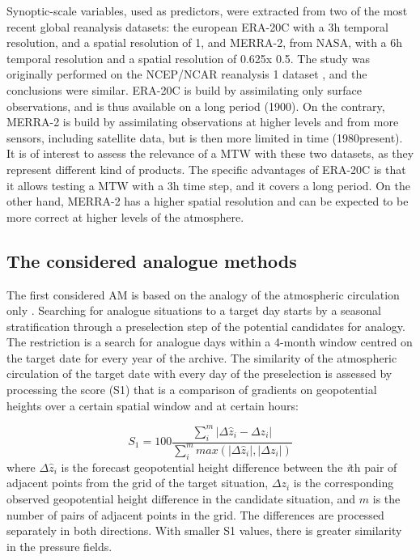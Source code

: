 \documentclass[hess, manuscript]{copernicus}
\begin{document}
	Synoptic-scale variables, used as predictors, were extracted from two of the most recent global reanalysis datasets: the european ERA-20C \citep{Poli2016} with a 3h temporal resolution, and a spatial resolution of 1\textdegree, and MERRA-2, from NASA, with a 6h temporal resolution and a spatial resolution of 0.625\textdegree x 0.5\textdegree. The study was originally performed on the NCEP/NCAR reanalysis 1 dataset \citep{Kalnay1996}, and the conclusions were similar. ERA-20C is build by assimilating only surface observations, and is thus available on a long period (1900). On the contrary, MERRA-2 is build by assimilating observations at higher levels and from more sensors, including satellite data, but is then more limited in time (1980\textendash present). It is of interest to assess the relevance of a MTW with these two datasets, as they represent different kind of products. The specific advantages of ERA-20C is that it allows testing a MTW with a 3h time step, and it covers a long period. On the other hand, MERRA-2 has a higher spatial resolution and can be expected to be more correct at higher levels of the atmosphere.
	
	\subsection{The considered analogue methods}
	\label{sec:analog_method}
	
	The first considered AM is based on the analogy of the atmospheric circulation only \citep[Table \ref{table:method_2Z},][]{Obled2002, Bontron2005}. Searching for analogue situations to a target day starts by a seasonal stratification through a preselection step of the potential candidates for analogy. The restriction is a search for analogue days within a 4-month window centred on the target date for every year of the archive. The similarity of the atmospheric circulation of the target date with every day of the preselection is assessed by processing the \citet{Teweles1954} score (S1) that is a comparison of gradients on geopotential heights over a certain spatial window and at certain hours:
	
	\begin{equation}
	\label{eq:S1}
	S_{1}=100 \frac {\displaystyle \sum_{i}^{m} \vert \Delta\hat{z}_{i} - \Delta z_{i} \vert}
	{\displaystyle \sum_{i}^{m} max( \vert \Delta\hat{z}_{i} \vert , \vert \Delta z_{i} \vert ) }
	\end{equation}
	where $\Delta \hat{z}_{i}$ is the forecast geopotential height difference between the \textit{i}th pair of adjacent points from the grid of the target situation, $\Delta z_{i}$ is the corresponding observed geopotential height difference in the candidate situation, and $m$ is the number of pairs of adjacent points in the grid. The differences are processed separately in both directions. With smaller S1 values, there is greater similarity in the pressure fields.
	
\end{document}
